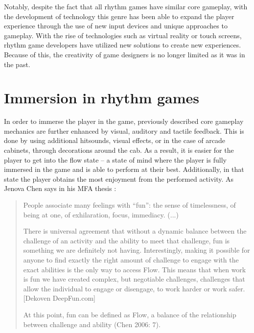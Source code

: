 Notably, despite the fact that all rhythm games have similar core gameplay, with the development of technology this genre has been able to expand the player experience through the use of new input devices and unique approaches to gameplay. With the rise of technologies such as virtual reality or touch screens, rhythm game developers have utilized new solutions to create new experiences. Because of this, the creativity of game designers is no longer limited as it was in the past.

\section{Immersion in rhythm games}
In order to immerse the player in the game, previously described core gameplay mechanics are further enhanced by visual, auditory and tactile feedback. This is done by using additional hitsounds, visual effects, or in the case of arcade cabinets, through decorations around the cab. As a result, it is easier for the player to get into the flow state -- a state of mind where the player is fully immersed in the game and is able to perform at their best. Additionally, in that state the player obtains the most enjoyment from the performed activity. As Jenova Chen says in his MFA thesis \cite{chen2006flow}:
\begin{quote}
    People associate many feelings with “fun”: the sense of timelessness, of being at one, of exhilaration, focus, immediacy. (...)
    
    There is universal agreement that without a dynamic balance between the challenge of an activity and the ability to meet that challenge, fun is something we are definitely not having. Interestingly, making it possible for anyone to find exactly the right amount of challenge to engage with the exact abilities is the only way to access Flow. This means that when work is fun we have created complex, but negotiable challenges, challenges that allow the individual to engage or disengage, to work harder or work safer. [Dekoven DeepFun.com]
    
    At this point, fun can be defined as Flow, a balance of the relationship between challenge and ability (Chen 2006: 7).
\end{quote} 
